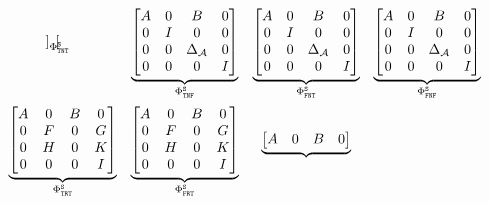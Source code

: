 \begin{equation}
\begin{matrix}
{\begin{bmatrix}
                \end{bmatrix}}_{\clmat_{\cT\cN\cT}^{\Skip}} &
                \underbrace{\begin{bmatrix}
                    A & 0 & B & 0 \\
                    0 & I & 0 & 0 \\
                    0 & 0 & \Delta_\actuator & 0 \\
                    0 & 0 & 0 & I
                \end{bmatrix}}_{\clmat_{\cT\cN\cF}^{\Skip}} &
                \underbrace{\begin{bmatrix}
                    A & 0 & B & 0 \\
                    0 & I & 0 & 0 \\
                    0 & 0 & \Delta_\actuator & 0 \\
                    0 & 0 & 0 & I
                \end{bmatrix}}_{\clmat_{\cF\cN\cT}^{\Skip}} &
                \underbrace{\begin{bmatrix}
                    A & 0 & B & 0 \\
                    0 & I & 0 & 0 \\
                    0 & 0 & \Delta_\actuator & 0 \\
                    0 & 0 & 0 & I
                \end{bmatrix}}_{\clmat_{\cF\cN\cF}^{\Skip}} \\[4em]
                \underbrace{\begin{bmatrix}
                    A & 0 & B & 0 \\
                    0 & F & 0 & G \\
                    0 & H & 0 & K \\
                    0 & 0 & 0 & I
                \end{bmatrix}}_{\clmat_{\cT\cR\cT}^{\Skip}} &
                \underbrace{\begin{bmatrix}
                    A & 0 & B & 0 \\
                    0 & F & 0 & G \\
                    0 & H & 0 & K \\
                    0 & 0 & 0 & I
                \end{bmatrix}}_{\clmat_{\cF\cR\cT}^{\Skip}} &
                \underbrace{\begin{bmatrix}
                    A & 0 & B & 0 \\

\end{bmatrix}}
\end{matrix}
\end{equation}
